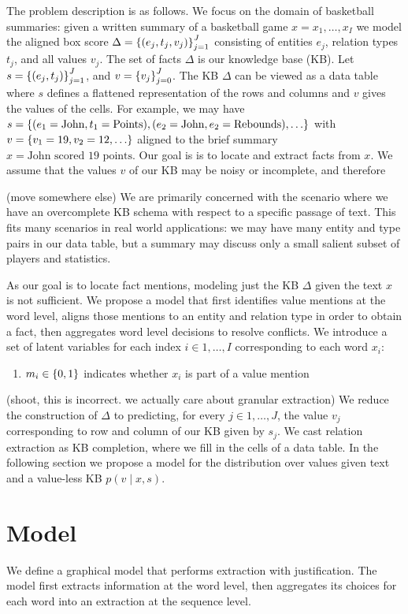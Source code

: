 \documentclass[12pt]{article}
\begin{document}
The problem description is as follows.
We focus on the domain of basketball summaries:
given a written summary of a basketball game $x = x_1, \ldots, x_{I}$
we model the aligned box score $\Delta = \left\{(e_j, t_j, v_j)\right\}_{j=1}^J$
consisting of entities $e_j$,
relation types $t_j$, and all values $v_j$.
The set of facts $\Delta$ is our knowledge base (KB).
Let $s = \left\{(e_j, t_j)\right\}_{j=1}^J$, and $v = \left\{v_j\right\}_{j=0}^J$.
The KB $\Delta$ can be viewed as a data table where
$s$ defines a flattened representation of the rows and columns and
$v$ gives the values of the cells.
For example, we may have
$
s = \left\{
    (e_1 = \textrm{John}, t_1 = \textrm{Points}),
    (e_2 = \textrm{John}, e_2 = \textrm{Rebounds}),
    \ldots
\right\}
$
with 
$ v = \left\{ v_1 = 19, v_2 = 12, \ldots \right\}$ 
aligned to the brief summary $x = \textrm{John scored 19 points}$.
Our goal is is to locate and extract facts from $x$.
We assume that the values $v$ of our KB may be noisy or incomplete,
and therefore 

(move somewhere else)
We are primarily concerned with the scenario where we have an overcomplete KB schema with
respect to a specific passage of text.
This fits many scenarios in real world applications:
we may have many entity and type pairs in our data table,
but a summary may discuss only a small salient subset of players and statistics.

As our goal is to locate fact mentions, modeling just the KB $\Delta$ given the text $x$
is not sufficient.
We propose a model that first identifies value mentions at the word level,
aligns those mentions to an entity and relation type in order to obtain a fact, 
then aggregates word level decisions to resolve conflicts.
We introduce a set of latent variables for each index $i \in 1, \ldots, I$
corresponding to each word $x_i$:
\begin{enumerate}
\item $m_i \in \left\{0,1\right\}$ indicates whether $x_i$ is part of a value mention
\end{enumerate}
(shoot, this is incorrect. we actually care about granular extraction)
We reduce the construction of $\Delta$ to predicting, for every $j\in 1,\ldots,J$,
the value $v_j$ corresponding to row and column of our KB given by $s_j$.
We cast relation extraction as KB completion, where we fill in the cells of a data table.
In the following section we propose a model for the distribution over
values given text and a value-less KB $p(v \mid x, s)$.

\section{Model}
We define a graphical model that performs extraction with justification. 
The model first extracts information at the word level,
then aggregates its choices for each word into an extraction at the sequence level.
\end{document}
